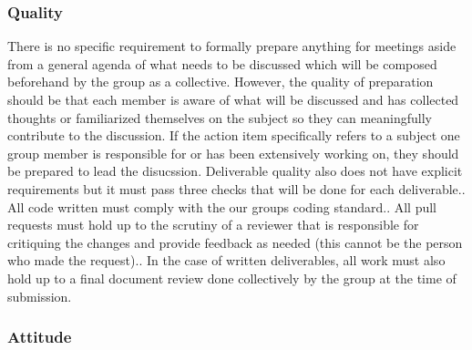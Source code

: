 \documentclass{article}
\begin{document}
\subsubsection*{Quality} 


\par{ There is no specific requirement to formally prepare anything for meetings aside from a general agenda of what needs to be discussed which will be
composed beforehand by the group as a collective. However, the quality of preparation should be that each member is aware of what will be discussed and 
has collected thoughts or familiarized themselves on the subject so they can meaningfully contribute to the discussion. If the action item specifically 
refers to a subject one group member is responsible for or has been extensively working on, they should be prepared to lead the disucssion. \newline\newline\indent
Deliverable quality also does not have explicit requirements but it must pass three checks that will be done for each deliverable.\newline{}. All code written must comply with the our groups coding standard.. All pull requests must hold up to the scrutiny of a reviewer that is responsible for critiquing the changes and provide feedback as needed (this cannot be the person who made the request).. In the case of written deliverables, all work must also hold up to a final document review done collectively by the group at the time of submission.}  

\subsubsection*{Attitude}

\end{document}
